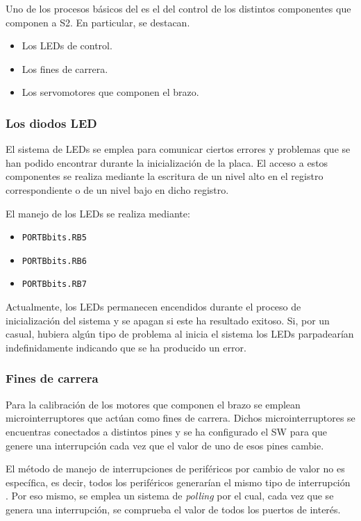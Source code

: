 Uno de los procesos básicos del \pArm{} es el del control de los distintos componentes
que componen a \ac{S2}. En particular, se destacan.

\begin{itemize}
    \item Los LEDs de control.
    \item Los fines de carrera.
    \item Los servomotores que componen el brazo.
\end{itemize}

\subsubsection{Los diodos LED}
El sistema de LEDs se emplea para comunicar ciertos errores y problemas
que se han podido encontrar durante la inicialización de la placa. El acceso a estos
componentes se realiza mediante la escritura de un nivel alto en el registro
correspondiente o de un nivel bajo en dicho registro.

El manejo de los LEDs se realiza mediante:
\begin{itemize}
    \item \texttt{PORTBbits.RB5}
    \item \texttt{PORTBbits.RB6}
    \item \texttt{PORTBbits.RB7}
\end{itemize}

Actualmente, los LEDs permanecen encendidos durante el proceso de inicialización
del sistema y se apagan si este ha resultado exitoso. Si, por un casual, hubiera
algún tipo de problema al inicia el sistema los LEDs parpadearían indefinidamente
indicando que se ha producido un error.

\subsubsection{Fines de carrera}
Para la calibración de los motores que componen el brazo se emplean microinterruptores
que actúan como fines de carrera. Dichos microinterruptores se encuentras conectados
a distintos pines y se ha configurado el \ac{SW} para que genere una interrupción
cada vez que el valor de uno de esos pines cambie.

El método de manejo de interrupciones de periféricos por cambio de valor no es
específica, es decir, todos los periféricos generarían el mismo tipo de interrupción
\cite{microchipDsPIC33EPIC24EFamily2013}. Por eso mismo, se emplea un sistema de
\textit{polling} por el cual, cada vez que se genera una interrupción, se comprueba el
valor de todos los puertos de interés.


